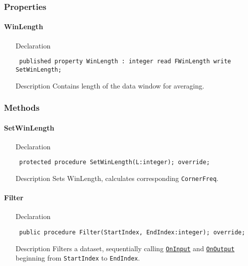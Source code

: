 \documentclass[12pt,a4paper,oneside]{report}
\newcommand{\declarationitem}[1]{{\addfontfeatures{FakeSlant} #1}}
\newcommand{\descriptiontitle}[1]{{\addfontfeatures{FakeSlant}#1}}
\newcommand{\code}[1]{\texttt{#1}}
\begin{document}
\subsubsection{Properties}
\paragraph{WinLength}\hspace*{\fill}
\begin{itemize}\label{lmfilters.TMovAvFilter-WinLength}
	\item[\declarationitem{Declaration}\hfill]
	\begin{flushleft}
		\code{
			published property WinLength : integer read FWinLength write SetWinLength;}
	\end{flushleft}
\item[\descriptiontitle{Description}] Contains length of the data window for averaging.
\end{itemize}
\subsubsection{Methods}
\paragraph{SetWinLength}
\label{lmfilters.TMovAvFilter-SetWinLength}
\begin{itemize}\item[\declarationitem{Declaration}\hfill]
	\begin{flushleft}
		\code{
			protected procedure SetWinLength(L:integer); override;}
	\end{flushleft}
\item[\descriptiontitle{Description}] Sets WinLength, calculates corresponding \code{CornerFreq}.
\end{itemize}
\paragraph{Filter}\hspace*{\fill}
\label{lmfilters.TMovAvFilter-Filter}
\begin{itemize}\item[\declarationitem{Declaration}\hfill]
	\begin{flushleft}
		\code{
			public procedure Filter(StartIndex, EndIndex:integer); override;}
	\end{flushleft}
\item[\descriptiontitle{Description}] Filters a dataset, sequentially calling \hyperref[lmfilters.TDigFilter-OnInput]{\code{OnInput}} and \hyperref[lmfilters.TDigFilter-OnOutput]{\code{OnOutput}} beginning from \code{StartIndex} to \code{EndIndex}.
\end{itemize}
\end{document}
